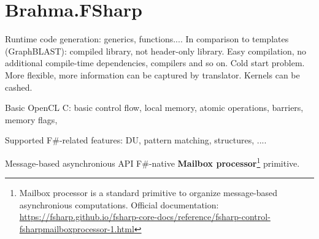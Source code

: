 \section{Brahma.FSharp}

Runtime code generation: generics, functions.... 
In comparison to templates (GraphBLAST): compiled library, not header-only library. 
Easy compilation, no additional compile-time dependencies, compilers and so on. 
Cold start problem. 
More flexible, more information can be captured by translator.
Kernels can be cashed. 

Basic OpenCL C: basic control flow, local memory, atomic operations, barriers, memory flags,

Supported F\#-related features: DU, pattern matching, structures, ....

Message-based asynchronious API F\#-native \textbf{Mailbox processor}\footnote{Mailbox processor is a standard primitive to organize message-based asynchronious computations. Official documentation: \url{https://fsharp.github.io/fsharp-core-docs/reference/fsharp-control-fsharpmailboxprocessor-1.html}} primitive.

